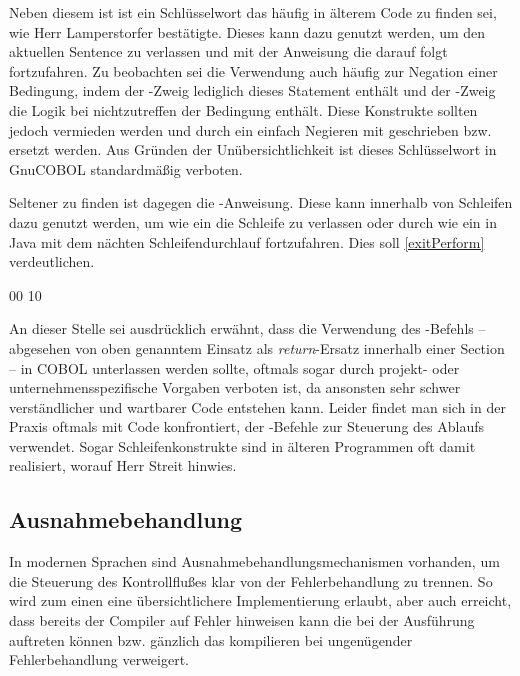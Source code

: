 Neben diesem ist  ist ein Schlüsselwort das häufig in älterem Code zu finden sei, wie Herr Lamperstorfer bestätigte. Dieses kann dazu genutzt werden, um den aktuellen Sentence zu verlassen und mit der Anweisung die darauf folgt fortzufahren. Zu beobachten sei die Verwendung auch häufig zur Negation einer Bedingung, indem der -Zweig lediglich dieses Statement enthält und der -Zweig die Logik bei nichtzutreffen der Bedingung enthält. Diese Konstrukte sollten jedoch vermieden werden und durch ein einfach Negieren mit  geschrieben bzw. ersetzt werden. Aus Gründen der Unübersichtlichkeit ist dieses Schlüsselwort in GnuCOBOL standardmäßig verboten. 

Seltener zu finden ist dagegen die -Anweisung. Diese kann innerhalb von Schleifen dazu genutzt werden, um wie ein  die Schleife zu verlassen oder durch  wie ein  in Java mit dem nächten Schleifendurchlauf fortzufahren. Dies soll \autoref{exitPerform} verdeutlichen.

\sepCodeAndOutputCheck
\begin{shellwindow}
00
10
\end{shellwindow}

An dieser Stelle sei ausdrücklich erwähnt, dass die Verwendung des -Befehls -- abgesehen von oben genanntem Einsatz als \textit{return}-Ersatz innerhalb einer Section -- in COBOL unterlassen werden sollte, oftmals sogar durch projekt- oder unternehmensspezifische Vorgaben verboten ist, da ansonsten sehr schwer verständlicher und wartbarer Code entstehen kann. Leider findet man sich in der Praxis oftmals mit Code konfrontiert, der -Befehle zur Steuerung des Ablaufs verwendet. Sogar Schleifenkonstrukte sind in älteren Programmen oft damit realisiert, worauf Herr Streit hinwies.

\subsection{Ausnahmebehandlung}

In modernen Sprachen sind Ausnahmebehandlungsmechanismen vorhanden, um die Steuerung des Kontrollflußes klar von der Fehlerbehandlung zu trennen. So wird zum einen eine übersichtlichere Implementierung erlaubt, aber auch erreicht, dass bereits der Compiler auf Fehler hinweisen kann die bei der Ausführung auftreten können bzw. gänzlich das kompilieren bei ungenügender Fehlerbehandlung verweigert.

